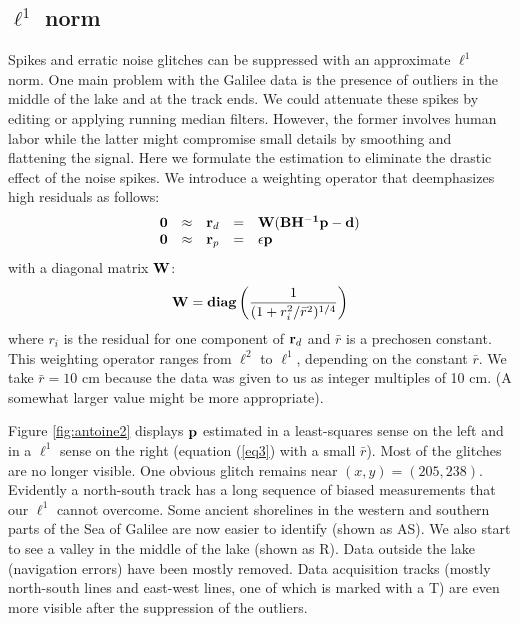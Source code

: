 \subsection{${\ell^1}$ norm}


Spikes and erratic noise glitches can be suppressed
with an approximate $\ell^1$ norm.
One main problem with the Galilee data is the presence of outliers
in the middle of the lake and at the track ends.
We could attenuate these spikes by editing or applying running median filters.
However, the former involves human labor
while the latter might compromise small details
by smoothing and flattening the signal.
Here we formulate the estimation
to eliminate the drastic effect of the noise spikes.
We introduce a weighting operator that deemphasizes high residuals as follows:
\begin{equation}
  \begin{array}{lllll}
    \bold 0 &\approx& \bold r_d &=& \bold W ( \bold B \bold {H^{-1}} \bold p - \bold d
    )\\
    \bold 0 &\approx&  \bold r_p &=& \epsilon \bold p
  \end{array} \label{eq3}
\end{equation}
with a diagonal matrix $\bf{W}$:
\begin{equation}
{\bf W} = {\bf diag} \left( \frac{1}{(1+r_i^2/\bar{r}^2)^{1/4}} \right)
\end{equation}
where $r_i$ is the residual for one component of $\bold r_d$
and $\bar{r}$ is a prechosen constant. This weighting operator
ranges from $\ell^2$ to $\ell^1$, depending on the constant $\bar{r}$.
We take $\bar{r}=10$ cm
because the data was given to us as integer multiples of 10 cm.
(A somewhat larger value might be more appropriate).




\par
Figure \ref{fig:antoine2} displays ${\bf p}$ estimated 
in a least-squares sense on the left and in a $\ell^1$ sense on the right 
(equation (\ref{eq3}) with a small $\bar{r}$).
Most of the glitches are no longer visible.
One obvious glitch remains near $(x,y)=(205,238)$.
Evidently a north-south track has a long sequence of biased measurements
that our $\ell^1$ cannot overcome.
Some ancient shorelines in the western and southern parts of the Sea of
Galilee are now easier to identify (shown as AS).
We also start to see a valley in the middle of the lake (shown as R). 
Data outside the lake (navigation errors) have been mostly removed.
Data acquisition tracks (mostly north-south lines and east-west lines,
one of which is marked with a T)
are even more visible after the suppression of the outliers.


